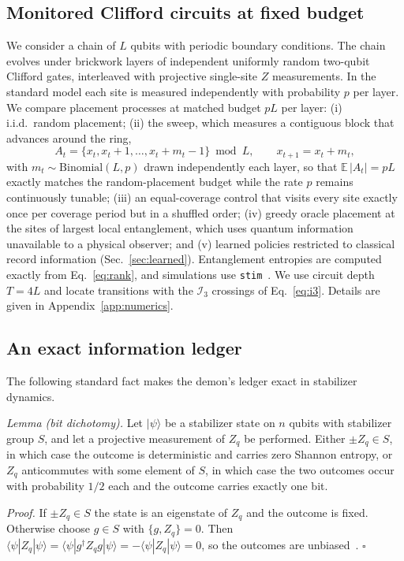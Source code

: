 \documentclass[aps,prb,twocolumn,superscriptaddress,nofootinbib]{revtex4-2}
\newcommand{\I}{\mathcal{I}}
\begin{document}
\subsection{Monitored Clifford circuits at fixed budget}
We consider a chain of $L$ qubits with periodic boundary conditions. The
chain evolves under brickwork layers of independent uniformly random
two-qubit Clifford gates, interleaved with projective single-site $Z$
measurements. In the standard model each site is measured independently
with probability $p$ per layer. We compare placement processes at matched
budget $pL$ per layer: (i) i.i.d.\ random placement; (ii) the sweep,
which measures a contiguous block that advances around the ring,
\begin{equation}
A_t = \{x_t, x_t + 1, \ldots, x_t + m_t - 1\} \bmod L,
\qquad
x_{t+1} = x_t + m_t,
\label{eq:sweep}
\end{equation}
with $m_t \sim \mathrm{Binomial}(L, p)$ drawn independently each layer,
so that $\mathbb{E}\,|A_t| = pL$ exactly matches the random-placement
budget while the rate $p$ remains continuously tunable; (iii) an
equal-coverage control that visits
every site exactly once per coverage period but in a shuffled order;
(iv) greedy oracle placement at the sites of largest local entanglement,
which uses quantum information unavailable to a physical observer; and
(v) learned policies restricted to classical record information
(Sec.~\ref{sec:learned}). Entanglement entropies are computed exactly
from Eq.~\eqref{eq:rank}, and simulations use
\texttt{stim}~\cite{AaronsonGottesman2004,Gidney2021}. We use circuit
depth $T = 4L$ and locate transitions with the $\I_3$ crossings of
Eq.~\eqref{eq:i3}. Details are given in Appendix~\ref{app:numerics}.

\subsection{An exact information ledger}
The following standard fact makes the demon's ledger exact in stabilizer
dynamics.

\emph{Lemma (bit dichotomy).} Let $|\psi\rangle$ be a stabilizer state on
$n$ qubits with stabilizer group $S$, and let a projective measurement of
$Z_q$ be performed. Either $\pm Z_q \in S$, in which case the outcome is
deterministic and carries zero Shannon entropy, or $Z_q$ anticommutes with
some element of $S$, in which case the two outcomes occur with probability
$1/2$ each and the outcome carries exactly one bit.

\emph{Proof.} If $\pm Z_q \in S$ the state is an eigenstate of $Z_q$ and
the outcome is fixed. Otherwise choose $g \in S$ with $\{g, Z_q\} = 0$.
Then
$\langle \psi | Z_q | \psi \rangle
 = \langle \psi | g^\dagger Z_q g | \psi \rangle
 = - \langle \psi | Z_q | \psi \rangle = 0$,
so the outcomes are unbiased~\cite{AaronsonGottesman2004,Fattal2004}.
\hfill$\square$
\end{document}
